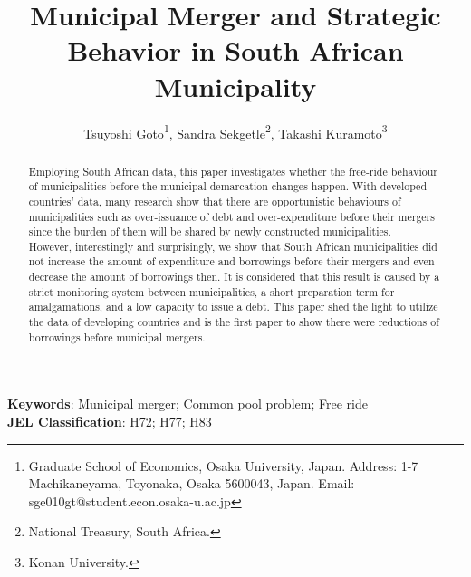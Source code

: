 \documentclass[dvipdfmx]{jsarticle}
\title{Municipal Merger and Strategic Behavior in South African Municipality}
\author{Tsuyoshi Goto\footnote{Graduate School of Economics, Osaka University, Japan.  Address: 1-7 Machikaneyama, Toyonaka, Osaka 5600043, Japan. Email: sge010gt@student.econ.osaka-u.ac.jp}, Sandra Sekgetle\footnote{National Treasury, South Africa.}, Takashi Kuramoto\footnote{Konan University.}}
\begin{document}
\maketitle
\newtheorem{As}{Assumption}
\newtheorem{Hy}{Hypothesis}
\newtheorem{Lem}{Lemma}
\newtheorem{Prop}{Proposition}
\newtheorem{Def}{Definition}
\newtheorem{Th}{Theorem}
\newtheorem{Cor}{Corollary}
\begin{abstract}
Employing South African data, this paper investigates whether the free-ride behaviour of municipalities before the municipal demarcation changes happen. With developed countries' data, many research show that there are opportunistic behaviours of municipalities such as over-issuance of debt and over-expenditure before their mergers since the burden of them will be shared by newly constructed municipalities.\\
\quad However, interestingly and surprisingly, we show that South African municipalities did not increase the amount of expenditure and borrowings before their mergers and even decrease the amount of borrowings then. It is considered that this result is caused by a strict monitoring system between municipalities, a short preparation term for amalgamations, and a low capacity to issue a debt. This paper shed the light to utilize the data of developing countries and is the first paper to show there were reductions of borrowings before municipal mergers.

\end{abstract}
\textbf{Keywords}: Municipal merger; Common pool problem; Free ride\\
\textbf{JEL Classification}: H72; H77; H83
\end{document}
